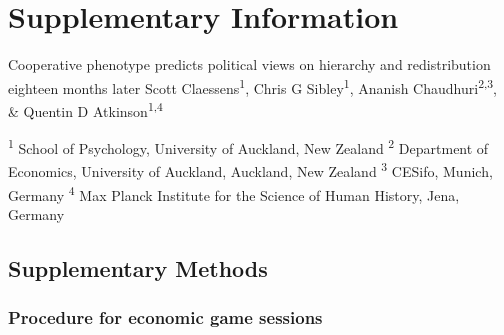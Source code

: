 \documentclass[
  man,floatsintext]{apa6}
\begin{document}
\endgroup
\newpage
\vspace*{60mm}

\renewcommand{\figurename}{Supplementary Figure}
\renewcommand{\tablename}{Supplementary Table}
\renewcommand{\thefigure}{\arabic{figure}} \setcounter{figure}{0}
\renewcommand{\thetable}{\arabic{table}} \setcounter{table}{0}
\renewcommand{\theequation}{\arabic{equation}} \setcounter{equation}{0}

\hypertarget{supplementary-information}{%
\section{\texorpdfstring{\textbf{Supplementary Information}}{Supplementary Information}}\label{supplementary-information}}

\setcounter{page}{1}
\centering

\noindent \footnotesize Cooperative phenotype predicts political views on hierarchy and redistribution eighteen months later \newline
\hspace*{8mm} \footnotesize Scott Claessens\textsuperscript{1}, Chris G Sibley\textsuperscript{1}, Ananish Chaudhuri\textsuperscript{2,3}, \& Quentin D Atkinson\textsuperscript{1,4} \newline

\raggedright

\noindent \footnotesize \textsuperscript{1} School of Psychology, University of Auckland, New Zealand \newline
\noindent \footnotesize \textsuperscript{2} Department of Economics, University of Auckland, Auckland, New Zealand \newline
\noindent \footnotesize \textsuperscript{3} CESifo, Munich, Germany \newline
\noindent \footnotesize \textsuperscript{4} Max Planck Institute for the Science of Human History, Jena, Germany \newline
\normalsize
\newpage

\hypertarget{supplementary-methods}{%
\subsection{Supplementary Methods}\label{supplementary-methods}}

\hypertarget{procedure-for-economic-game-sessions}{%
\subsubsection{Procedure for economic game sessions}\label{procedure-for-economic-game-sessions}}
\end{document}
